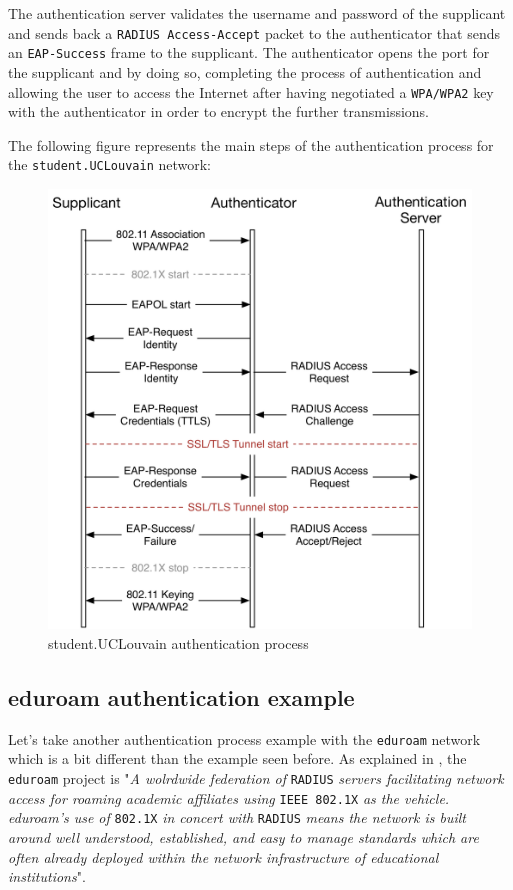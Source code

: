 The authentication server validates the username and password of the supplicant and sends back a \texttt{RADIUS Access-Accept} packet to the authenticator that sends an \texttt{EAP-Success} frame to the supplicant. The authenticator opens the port for the supplicant and by doing so, completing the process of authentication and allowing the user to access the Internet after having negotiated a \texttt{WPA/WPA2} key with the authenticator in order to encrypt the further transmissions.

The following figure represents the main steps of the authentication process for the \texttt{student.UCLouvain} network:

\begin{figure}[H]
	\center
	\includegraphics[width=.7\linewidth]{Pictures/chapter2/student.png}
	\caption{student.UCLouvain authentication process}
\end{figure}


\subsection{eduroam authentication example}
Let's take another  authentication process example with the \texttt{eduroam} network which is a bit different than the example seen before.
As explained in \cite{eduroamRadius}, the \texttt{eduroam} project is "\textit{A wolrdwide federation of} \texttt{RADIUS} \textit{ servers facilitating network access for roaming academic affiliates using} \texttt{IEEE 802.1X} \textit{as the vehicle. eduroam's use of} \texttt{802.1X} \textit{in concert with} \texttt{RADIUS} \textit{means the network is built around well understood, established, and easy to manage standards which are often already deployed within the network infrastructure of educational institutions}".

